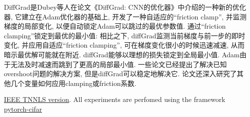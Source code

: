 DiffGrad是Dubey等人在论文《DiffGrad: CNN的优化器》中介绍的一种新的优化器, 它建立在Adam优化器的基础上, 开发了一种自适应的“friction clamp”, 并监测梯度的局部变化, 以便自动锁定Adam可以跳过的最优参数值.
通过“friction clamping”锁定到最优的最小值: 相比之下, diffGrad监测当前梯度与前一步的即时变化, 并应用自适应“friction clamping”, 可在梯度变化很小的时候迅速减速, 从而暗示最优解可能就在附近.
diffGrad能够以理想的损失锁定到全局最小值. Adam由于无法及时减速而跳到了更高的局部最小值.
一些论文已经提出了解决已知overshoot问题的解决方案, 但是diffGrad可以稳定地解决它.
论文还深入研究了其他几个变量如何应用clamping或friction系数.

\href{https://ieeexplore.ieee.org/document/8939562}{IEEE TNNLS version}.
All experiments are perfomed using the framework \href{https://github.com/kuangliu/pytorch-cifar}{pytorch-cifar}
